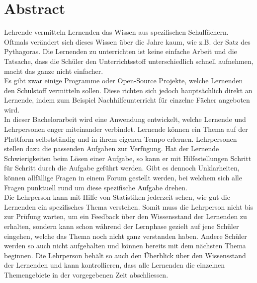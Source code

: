 \afterpage{\blankpage}
\section*{Abstract}

Lehrende vermitteln Lernenden das Wissen aus spezifischen Schulfächern. Oftmals verändert sich dieses Wissen über die Jahre kaum, wie z.B. der Satz des Pythagoras. Die Lernenden zu unterrichten ist keine einfache Arbeit und die Tatsache, dass die Schüler den Unterrichtsstoff unterschiedlich schnell aufnehmen, macht das ganze nicht einfacher. \\

Es gibt zwar einige Programme oder Open-Source Projekte, welche Lernenden den Schulstoff vermitteln sollen. Diese richten sich jedoch hauptsächlich direkt an Lernende, indem zum Beispiel Nachhilfeunterricht für einzelne Fächer angeboten wird.\\

In dieser Bachelorarbeit wird eine Anwendung entwickelt, welche Lernende und Lehrpersonen enger miteinander verbindet. Lernende können ein Thema auf der Plattform selbstständig und in ihrem eigenen Tempo erlernen. Lehrpersonen stellen dazu die passenden Aufgaben zur Verfügung. Hat der Lernende Schwierigkeiten beim Lösen einer Aufgabe, so kann er mit Hilfestellungen Schritt für Schritt durch die Aufgabe geführt werden. Gibt es dennoch Unklarheiten, können allfällige Fragen in einem Forum gestellt werden, bei welchem sich alle Fragen punktuell rund um diese spezifische Aufgabe drehen. \\

Die Lehrperson kann mit Hilfe von Statistiken jederzeit sehen, wie gut die Lernenden ein spezifisches Thema verstehen. Somit muss die Lehrperson nicht bis zur Prüfung warten, um ein Feedback über den Wissensstand der Lernenden zu erhalten, sondern kann schon während der Lernphase gezielt auf jene Schüler eingehen, welche das Thema noch nicht ganz verstanden haben. Andere Schüler werden so auch nicht aufgehalten und können bereits mit dem nächsten Thema beginnen. Die Lehrperson behält so auch den Überblick über den Wissensstand der Lernenden und kann kontrollieren, dass alle Lernenden die einzelnen Themengebiete in der vorgegebenen Zeit abschliessen.


\newpage